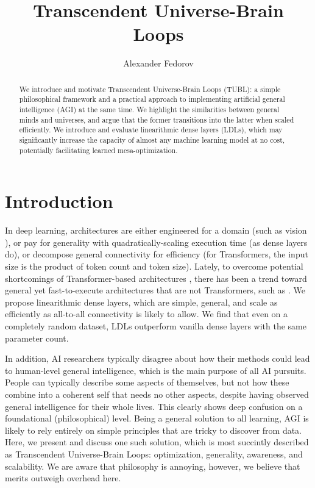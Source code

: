 \documentclass{article}
\begin{document}
\title{Transcendent Universe-Brain Loops}
\author{Alexander Fedorov}
\date{}

\maketitle

\begin{abstract}

We introduce and motivate Transcendent Universe-Brain Loops (TUBL): a simple philosophical framework and a practical approach to implementing artificial general intelligence (AGI) at the same time. We highlight the similarities between general minds and universes, and argue that the former transitions into the latter when scaled efficiently. We introduce and evaluate linearithmic dense layers (LDLs), which may significantly increase the capacity of almost any machine learning model at no cost, potentially facilitating learned mesa-optimization.

\end{abstract}

\section{Introduction}

In deep learning, architectures are either engineered for a domain (such as vision \cite{he2015deep} \cite{Khan2020}), or pay for generality with quadratically-scaling execution time (as dense layers do), or decompose general connectivity for efficiency \cite{dosovitskiy2021image} \cite{tolstikhin2021mlpmixer} \cite{vaswani2017attention} (for Transformers, the input size is the product of token count and token size). Lately, to overcome potential shortcomings of Transformer-based architectures \cite{Hahn_2020}, there has been a trend toward general yet fast-to-execute architectures that are not Transformers, such as \cite{tolstikhin2021mlpmixer}. We propose linearithmic dense layers, which are simple, general, and scale as efficiently as all-to-all connectivity is likely to allow. We find that even on a completely random dataset, LDLs outperform vanilla dense layers with the same parameter count.

In addition, AI researchers typically disagree about how their methods could lead to human-level general intelligence, which is the main purpose of all AI pursuits. People can typically describe some aspects of themselves, but not how these combine into a coherent self that needs no other aspects, despite having observed general intelligence for their whole lives. This clearly shows deep confusion on a foundational (philosophical) level. Being a general solution to all learning, AGI is likely to rely entirely on simple principles that are tricky to discover from data. Here, we present and discuss one such solution, which is most succintly described as Transcendent Universe-Brain Loops: optimization, generality, awareness, and scalability. We are aware that philosophy is annoying, however, we believe that merits outweigh overhead here.
\end{document}
